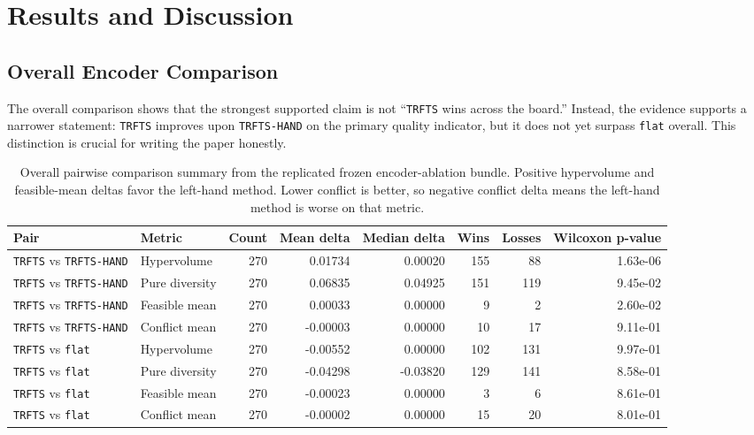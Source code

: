 \documentclass[a4paper,fleqn]{cas-dc}
\begin{document}
\section{Results and Discussion}

\subsection{Overall Encoder Comparison}

The overall comparison shows that the strongest supported claim is not ``\texttt{TRFTS} wins across the board.'' Instead, the evidence supports a narrower statement: \texttt{TRFTS} improves upon \texttt{TRFTS-HAND} on the primary quality indicator, but it does not yet surpass \texttt{flat} overall. This distinction is crucial for writing the paper honestly.

\begin{table}[t]
\centering
\small
\caption{Overall pairwise comparison summary from the replicated frozen encoder-ablation bundle. Positive hypervolume and feasible-mean deltas favor the left-hand method. Lower conflict is better, so negative conflict delta means the left-hand method is worse on that metric.}
\label{tab:overall_pairwise}
\begin{tabular}{llrrrrrr}
\toprule
Pair & Metric & Count & Mean delta & Median delta & Wins & Losses & Wilcoxon p-value \\
\midrule
\texttt{TRFTS} vs \texttt{TRFTS-HAND} & Hypervolume & 270 & 0.01734 & 0.00020 & 155 & 88 & 1.63e-06 \\
\texttt{TRFTS} vs \texttt{TRFTS-HAND} & Pure diversity & 270 & 0.06835 & 0.04925 & 151 & 119 & 9.45e-02 \\
\texttt{TRFTS} vs \texttt{TRFTS-HAND} & Feasible mean & 270 & 0.00033 & 0.00000 & 9 & 2 & 2.60e-02 \\
\texttt{TRFTS} vs \texttt{TRFTS-HAND} & Conflict mean & 270 & -0.00003 & 0.00000 & 10 & 17 & 9.11e-01 \\
\midrule
\texttt{TRFTS} vs \texttt{flat} & Hypervolume & 270 & -0.00552 & 0.00000 & 102 & 131 & 9.97e-01 \\
\texttt{TRFTS} vs \texttt{flat} & Pure diversity & 270 & -0.04298 & -0.03820 & 129 & 141 & 8.58e-01 \\
\texttt{TRFTS} vs \texttt{flat} & Feasible mean & 270 & -0.00023 & 0.00000 & 3 & 6 & 8.61e-01 \\
\texttt{TRFTS} vs \texttt{flat} & Conflict mean & 270 & -0.00002 & 0.00000 & 15 & 20 & 8.01e-01 \\
\bottomrule
\end{tabular}
\end{table}
\end{document}
